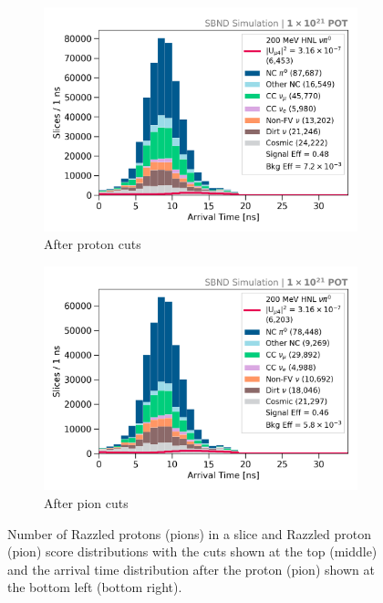 \begin{figure}[ht!]
\begin{subfigure}[b]{0.495\textwidth}
            \includegraphics[width=\textwidth]{beam_bucket_postproton}
            \caption{After proton cuts}%
            \label{fig:bb_post_proton}
        \end{subfigure}
        \hfill
        \begin{subfigure}[b]{0.495\textwidth}   
            \centering 
            \includegraphics[width=\textwidth]{beam_bucket_postpion}
            \caption{After pion cuts}%
            \label{fig:bb_post_pion}
        \end{subfigure}
	\caption[Proton and Pion Cuts]{
		Number of Razzled protons (pions) in a slice and Razzled proton (pion) score distributions with the cuts shown at the top (middle)
		and the arrival time distribution after the proton (pion) shown at the bottom left (bottom right). 
	}
        \label{fig:razzled_proton_cut}
\end{figure}
